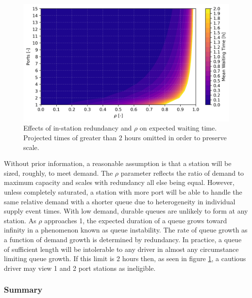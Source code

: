 \begin{figure}[H]
	\centering
	\includegraphics[width = \linewidth]{figs/waiting_time_rho_ports.png}
	\caption{Effects of in-station redundancy and $\rho$ on expected waiting time. Projected times of greater than 2 hours omitted in order to preserve scale.}
	\label{fig:reduncancy_rho_wq}
\end{figure}

Without prior information, a reasonable assumption is that a station will be sized, roughly, to meet demand. The $\rho$ parameter reflects the ratio of demand to maximum capacity and scales with redundancy all else being equal. However, unless completely saturated, a station with more port will be able to handle the same relative demand with a shorter queue due to heterogeneity in individual supply event times. With low demand, durable queues are unlikely to form at any station. As $\rho$ approaches 1, the expected duration of a queue grows toward infinity in a phenomenon known as queue instability. The rate of queue growth as a function of demand growth is determined by redundancy. In practice, a queue of sufficient length will be intolerable to any driver in almost any circumstance limiting queue growth. If this limit is 2 hours then, as seen in figure \ref{fig:reduncancy_rho_wq}, a cautious driver may view 1 and 2 port stations as ineligible.

\subsubsection*{Summary}


